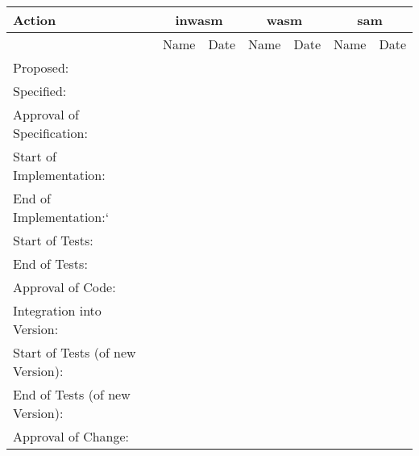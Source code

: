 \begin{center}
\begin{tabular}{|l||c|c||c|c||c|c||}
\hline\hline
Action & \multicolumn{2}{|c|}{inwasm} &
\multicolumn{2}{|c|}{wasm} & \multicolumn{2}{|c|}{sam}  \\
\hline
& Name & Date & Name & Date & Name & Date \\
\hline\hline
 Proposed:& & & & & & \\
 Specified:& & & & & & \\
 Approval of Specification:& & & & & & \\
 Start of Implementation:& & & & & & \\
 End of Implementation:`& & & & & & \\
 Start of Tests:& & & & & & \\
 End of Tests:& & & & & & \\
 Approval of Code:& & & & & & \\
 Integration into Version: & & & & & & \\
 Start of Tests (of new Version):& & & & & & \\
 End of Tests (of new Version):& & & & & & \\
 Approval of Change:& & & & & & \\
\hline\hline
\end{tabular}
\end{center}


